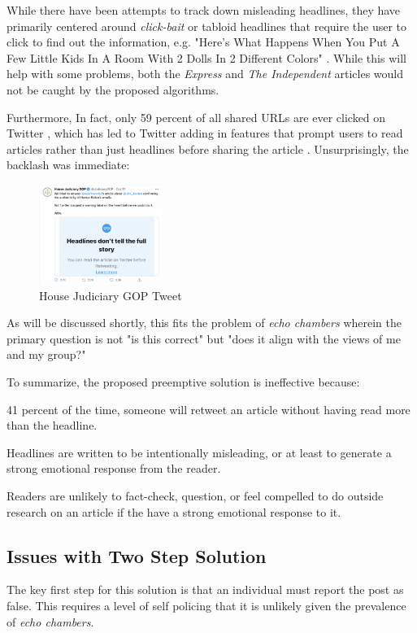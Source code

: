  While there have been attempts to track down misleading headlines, they have primarily centered around \textit{click-bait} or tabloid headlines \citep{chen2015misleading,chakraborty2016stop}that require the user to click to find out the information, e.g. "Here’s What Happens When You Put A Few Little Kids In A Room With 2 Dolls In 2 Different Colors" \citep{chen2015misleading}. While this will help with some problems, both the \textit{Express} and \textit{The Independent} articles would not be caught by the proposed algorithms. 
 
 Furthermore, In fact, only 59 percent of all shared URLs are ever clicked on Twitter \citep{gabielkov2016social}, which has led to Twitter adding in features that prompt users to read articles rather than just headlines before sharing the article \citep{reuters2020article}. Unsurprisingly, the backlash was immediate:
 \begin{figure}[htp]
    \centering
    \includegraphics[width=4cm]{JudiciaryTweet.png}
    \caption{House Judiciary GOP Tweet}
    \label{fig:House Judiciary GOP Tweet}
\end{figure}
As will be discussed shortly, this fits the problem of \textit{echo chambers} wherein the primary question is not "is this correct" but "does it align with the views of me and my group?" 

To summarize, the proposed preemptive solution is ineffective because:
\item 41 percent of the time, someone will retweet an article without having read more than the headline. \citep{gabielkov2016social}
\item Headlines are written to be intentionally misleading, or at least to generate a strong emotional response from the reader.\citep{chesney2017incongruent}
\item Readers are unlikely to fact-check, question, or feel compelled to do outside research on an article if the have a strong emotional response to it.\citep{nyhan2010corrections}
 
 \subsection{Issues with Two Step Solution}
 The key first step for this solution is that an individual must report the post as false. This requires a level of self policing that it is unlikely given the prevalence of \textit{echo chambers}. 
 
